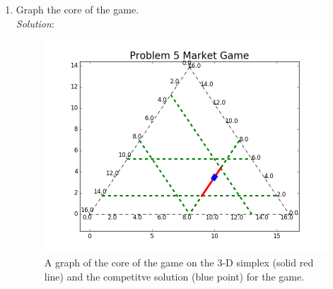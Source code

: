 \documentclass{article}
\begin{document}
\begin{enumerate}
\begin{enumerate}
    \hfill\newline
    \item Graph the core of the game. \\

    \textit{Solution}: \\
    \begin{figure}[h!]
      \centering
      \includegraphics[width=.4\linewidth]{05_b}
      \caption{A graph of the core of the game on the 3-D simplex (solid red line) and the competitve solution (blue point) for the game.}
      \label{fig:05_b}
    \end{figure}
    











\end{enumerate}
\end{enumerate}
\end{document}
